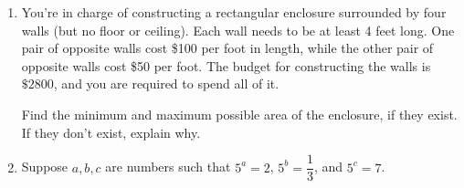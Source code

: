 \documentclass{article}
\begin{document}
\begin{enumerate}
\begin{enumerate}
  \item

    \begin{workshop}
      Help students think about consistency here. For example, once they've tried to figure out where the 3 points move to, they can check that the resulting points are actually on $y = 3^{2x}$ by plugging the points into this equation.

      The points should also help them think about whether they've situated the graphs correctly relative to each other: they have the same $y$-intercept, $3^{2x}$ is higher when $x > 0$, and $3^x$ is higher when $x < 0$. 
    \end{workshop}

    \begin{problem}[\stretch{0.25}]
      Use an appropriate graph transformation to graph $y = 3^{2x}$ in a different color on the same set of axes. Where do the 3 points you labeled in (a) move to? Label those points with their exact coordinates. 
    \end{problem}

  \item
    \begin{problem}[\nstretch{0.1}]
      We can write $3^{2x}$ as $b^x$ for what value of $b$?
    \end{problem}
  \end{enumerate}

\item  \label{optimization-enclosure}

  \begin{problem}[\newpage]
    You're in charge of constructing a rectangular enclosure surrounded by four walls (but no floor or ceiling). Each wall needs to be at least 4 feet long. One pair of opposite walls cost \$100 per foot in length, while the other pair of opposite walls cost \$50 per foot. The budget for constructing the walls is $\$2800$, and you are required to spend all of it.

    Find the minimum and maximum possible area of the enclosure, if they exist. If they don't exist, explain why. 
  \end{problem}

\item 

  Suppose $a, b, c$ are numbers such that $5^a = 2$, $5^b = \dfrac{1}{3}$, and $5^c = 7$.


\end{enumerate}
\end{document}
